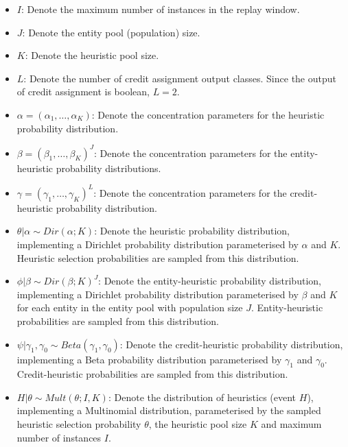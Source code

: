 \begin{itemize}
      \item $I$: Denote the maximum number of instances in the replay window.
      \item $J$: Denote the entity pool (population) size.
      \item $K$: Denote the heuristic pool size.
      \item $L$: Denote the number of credit assignment output classes. Since the output of credit assignment is boolean, $L = 2$.

      \item $\alpha = (\alpha_{1}, \dots, \alpha_{K})$: Denote the concentration parameters for the heuristic probability distribution.
      \item $\beta = (\beta_{1}, \dots, \beta_{K})^{J}$: Denote the concentration parameters for the entity-heuristic probability distributions.
      \item $\gamma = (\gamma_{1}, \dots, \gamma_{K})^{L}$: Denote the concentration parameters for the credit-heuristic probability distribution.

      \item $\theta \vert \alpha \sim Dir(\alpha; K)$: Denote the heuristic probability distribution, implementing a Dirichlet probability distribution parameterised by $\alpha$ and $K$. Heuristic selection probabilities are sampled from this distribution.

      \item $\phi \vert \beta \sim Dir(\beta; K)^{J}$: Denote the entity-heuristic probability distribution, implementing a Dirichlet probability distribution parameterised by $\beta$ and $K$ for each entity in the entity pool with population size $J$. Entity-heuristic probabilities are sampled from this distribution.

      \item $\psi \vert \gamma_{1}, \gamma_{0}  \sim Beta(\gamma_{1}, \gamma_{0})$: Denote the credit-heuristic probability distribution, implementing a Beta probability distribution parameterised by $\gamma_{1}$ and $\gamma_{0}$. Credit-heuristic probabilities are sampled from this distribution.

      \item $H \vert \theta \sim Mult(\theta; I, K)$: Denote the distribution of heuristics (event $H$), implementing a Multinomial distribution, parameterised by the sampled heuristic selection probability $\theta$, the heuristic pool size $K$ and maximum number of instances $I$.


\end{itemize}
